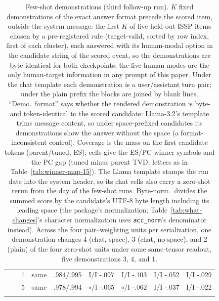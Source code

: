 \begin{table}[t]
\begin{tabular}{@{}llccccccc@{}}
 &  & 1 & same & .984/.995 & I/I -.097 & I/I -.103 & I/I -.052 & I/I -.029 \\
 &  & 5 & same & .978/.994 & $\circ$/I -.065 & $\circ$/I -.062 & I/I -.037 & I/I -.022 \\
\addlinespace[1pt]
\bottomrule
\end{tabular}
\caption{Few-shot demonstrations (third follow-up run). $K$ fixed demonstrations of the exact answer format precede the scored item, outside the system message: the first $K$ of five held-out ISSP items chosen by a pre-registered rule (target-valid, sorted by row index, first of each cluster), each answered with its human-modal option in the candidate string of the scored event, so the demonstrations are byte-identical for both checkpoints; the five human modes are the only human-target information in any prompt of this paper. Under the chat template each demonstration is a user/assistant turn pair; under the plain prefix the blocks are joined by blank lines. ``Demo.\ format'' says whether the rendered demonstration is byte- and token-identical to the scored candidate: Llama-3.2's template trims message content, so under space-prefixed candidates its demonstrations show the answer without the space (a format-inconsistent control). Coverage is the mass on the first candidate tokens (parent/tuned, ES); cells give the ES/PC winner symbols and the PC gap (tuned minus parent TVD; letters as in Table~\ref{tab:winner-map-15}). The Llama template stamps the run date into the system header, so its chat cells also carry a zero-shot rerun from the day of the few-shot runs. Byte-norm.\ divides the summed score by the candidate's UTF-8 byte length including its leading space (the package's normalization; Table~\ref{tab:what-changes}'s character normalization uses \texttt{acc\_norm}'s denominator instead). Across the four pair--weighting units per serialization, one demonstration changes 4 (chat, space), 3 (chat, no space), and 2 (plain) of the four zero-shot units under some same-tensor readout, five demonstrations 3, 4, and 1.}
\label{tab:fewshot}
\end{table}

